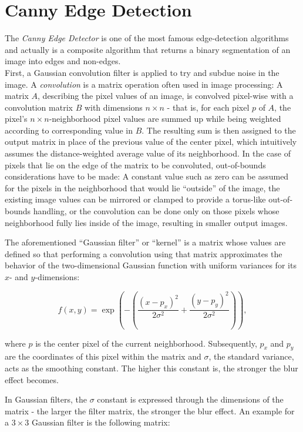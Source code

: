 	\section{Canny Edge Detection}
\label{sec:canny}
The \textit{Canny Edge Detector} \cite{canny} is one of the most famous edge-detection algorithms and actually is a composite algorithm that returns a binary segmentation of an image into edges and non-edges.\\

\noindent First, a Gaussian convolution filter is applied to try and subdue noise in the image. A \textit{convolution} is a matrix operation often used in image processing: A matrix $A$, describing the pixel values of an image, is convolved pixel-wise with a convolution matrix $B$ with dimensions $n \times n$ - that is, for each pixel $p$ of $A$, the pixel's $n \times n$-neighborhood pixel values are summed up while being weighted according to corresponding value in $B$. The resulting sum is then assigned to the output matrix in place of the previous value of the center pixel, which intuitively assumes the distance-weighted average value of its neighborhood. In the case of pixels that lie on the edge of the matrix to be convoluted, out-of-bounds considerations have to be made: A constant value such as zero can be assumed for the pixels in the neighborhood that would lie ``outside'' of the image, the existing image values can be mirrored or clamped to provide a torus-like out-of-bounds handling, or the convolution can be done only on those pixels whose neighborhood fully lies inside of the image, resulting in smaller output images.

The aforementioned ``Gaussian filter'' or ``kernel'' is a matrix whose values are defined so that performing a convolution using that matrix approximates the behavior of the two-dimensional Gaussian function with uniform variances for its $x$- and $y$-dimensions:

\[ f(x, y) = \exp \left(- \left( \frac{\left(x - p_x \right)^2}{2\sigma^2} + \frac{ \left(y - p_y \right)^2}{2\sigma^2} \right) \right), \]

\noindent where $p$ is the center pixel of the current neighborhood. Subsequently, $p_x$ and $p_y$ are the coordinates of this pixel within the matrix and $\sigma$, the standard variance, acts as the smoothing constant. The higher this constant is, the stronger the blur effect becomes.

In Gaussian filters, the $\sigma$ constant is expressed through the dimensions of the matrix - the larger the filter matrix, the stronger the blur effect. An example for a $3 \times 3$ Gaussian filter is the following matrix:

